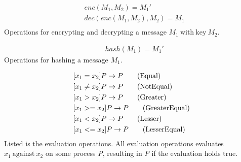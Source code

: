 
\begin{align}
    &enc(M_1, M_2) = M_1' \tag{Encrypt}\\
    &dec(enc(M_1, M_2),M_2) = M_1 \tag{Decrypt}\\
\end{align}
Operations for encrypting and decrypting a message $M_1\ \mathrm{with\ key}\ M_2$.


\begin{align}
    &hash(M_1) = M_1' \tag{Hashing}
\end{align}
Operations for hashing a message $M_1$.


\begin{align}
    &[x_1 = x_2]P \rightarrow P \tag{Equal}\\
    &[x_1 \neq x_2]P \rightarrow P \tag{NotEqual}\\
    &[x_1 > x_2]P \rightarrow P \tag{Greater}\\
    &[x_1 >= x_2]P \rightarrow P \tag{GreaterEqual}\\
    &[x_1 < x_2]P \rightarrow P \tag{Lesser}\\
    &[x_1 <= x_2]P \rightarrow P \tag{LesserEqual}
\end{align}
Listed is the evaluation operations. All evaluation operations evaluates $x_1\ \mathrm{against}\ x_2$ on some process \textit{P}, resulting in \textit{P} if the evaluation holds true.


